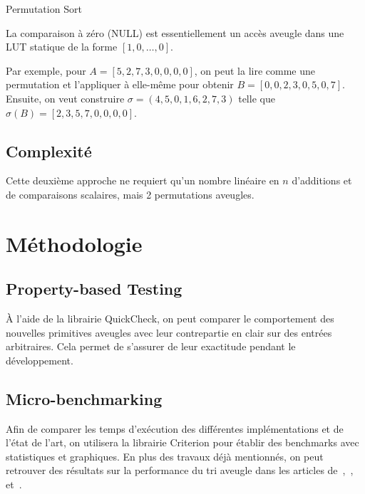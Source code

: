 \documentclass{article}
\begin{document}
\begin{algorithm}
    \caption{Permutation Sort}
    \begin{algorithmic}
            \EndFor{}

        \EndFunction{}
    \end{algorithmic}
\end{algorithm}

La comparaison à zéro (NULL) est essentiellement un accès aveugle dans une LUT statique de la forme $[1, 0, \dots, 0]$.

Par exemple, pour $A = [5, 2, 7, 3, 0, 0, 0, 0]$, on peut la lire comme une permutation et l'appliquer à elle-même pour obtenir $B = [0, 0, 2, 3, 0, 5, 0, 7]$. Ensuite, on veut construire $\sigma = (4, 5, 0, 1, 6, 2, 7, 3)$ telle que $\sigma(B) = [2, 3, 5, 7, 0, 0, 0, 0]$.


\subsection{Complexité}

Cette deuxième approche ne requiert qu'un nombre linéaire en $n$ d'additions et de comparaisons scalaires, mais 2 permutations aveugles.

\section{Méthodologie}

\subsection{Property-based Testing}

À l'aide de la librairie QuickCheck, on peut comparer le comportement des nouvelles primitives aveugles avec leur contrepartie en clair sur des entrées arbitraires. Cela permet de s'assurer de leur exactitude pendant le développement.

\subsection{Micro-benchmarking}

Afin de comparer les temps d'exécution des différentes implémentations et de l'état de l'art, on utilisera la librairie Criterion pour établir des benchmarks avec statistiques et graphiques. En plus des travaux déjà mentionnés, on peut retrouver des résultats sur la performance du tri aveugle dans les articles de~\cite{baldimtsi_sorting_2014},~\cite{cryptoeprint:2011/122},~\cite{zuber2021efficient} et~\cite{choffrut_sable_2023}.

\newpage




\end{document}
